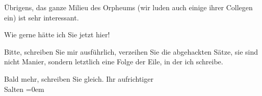 \pstart
           Übrigens, das ganze Milieu des Orpheums (wir luden
               auch einige ihrer Collegen ein) ist sehr interessant.\pend
           
\pstart
           Wie gerne hätte ich Sie jetzt hier!\pend
           
\pstart
           Bitte, schreiben Sie mir ausführlich, verzeihen Sie die abgehackten Sätze, sie sind
               nicht Manier, sondern letztlich eine Folge der Eile, in der ich schreibe.\pend
           
\pstart
           Bald mehr, schreiben Sie gleich. Ihr aufrichtiger {\\[\baselineskip]}\spacefill\mbox{Salten}\pend
           \leftskip=0em{}\endnumbering{}  \newcommand{\dateiname}{L03103}\newcommand{\titel}{Felix Salten an Arthur Schnitzler, 2. 9. 1891}\newcommand{\editorInnen}{Martin Anton Müller und Laura Untner}
